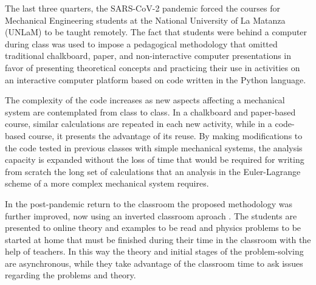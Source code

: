 The last three quarters, the SARS-CoV-2 pandemic forced the courses for Mechanical Engineering students at the National University of La Matanza (UNLaM) to be taught remotely. The fact that students were behind a computer during class was used to impose a pedagogical methodology that omitted traditional chalkboard, paper, and non-interactive computer presentations in favor of presenting theoretical concepts and practicing their use in activities on an interactive computer platform based on code written in the Python language.

The complexity of the code increases as new aspects affecting a mechanical system are contemplated from class to class. 
In a chalkboard and paper-based course, similar calculations are repeated in each new activity, while in a code-based course, it presents the advantage of its reuse. 
By making modifications to the code tested in previous classes with simple mechanical systems, the analysis capacity is expanded without the loss of time that would be required for writing from scratch the long set of calculations that an analysis in the Euler-Lagrange scheme of a more complex mechanical system requires.


In the post-pandemic return to the classroom the proposed methodology was further improved, now using an inverted classroom aproach . The students are presented to online theory and examples to be read and physics problems to be started at home that must be finished during their time in the classroom with the help of teachers. In this way the theory and initial stages of the problem-solving are asynchronous, while they take advantage of the classroom time to ask issues regarding the problems and theory. 




